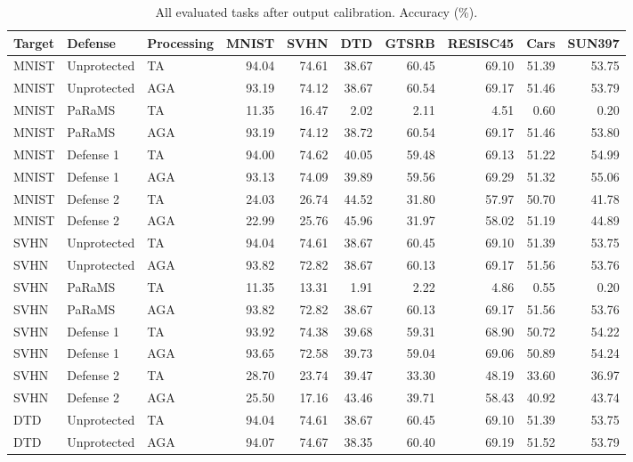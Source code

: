 \begin{table}[t]
\centering\small
\setlength{\tabcolsep}{4pt}
\caption{All evaluated tasks after output calibration. Accuracy (\%).}
\label{tab:eight_calibration}
\begin{tabular}{@{}lllrrrrrrr@{}}
\toprule
Target & Defense & Processing & MNIST & SVHN & DTD & GTSRB & RESISC45 & Cars & SUN397 \\
\midrule
MNIST & Unprotected & TA & 94.04 & 74.61 & 38.67 & 60.45 & 69.10 & 51.39 & 53.75 \\
MNIST & Unprotected & AGA & 93.19 & 74.12 & 38.67 & 60.54 & 69.17 & 51.46 & 53.79 \\
MNIST & PaRaMS & TA & 11.35 & 16.47 & 2.02 & 2.11 & 4.51 & 0.60 & 0.20 \\
MNIST & PaRaMS & AGA & 93.19 & 74.12 & 38.72 & 60.54 & 69.17 & 51.46 & 53.80 \\
MNIST & Defense 1 & TA & 94.00 & 74.62 & 40.05 & 59.48 & 69.13 & 51.22 & 54.99 \\
MNIST & Defense 1 & AGA & 93.13 & 74.09 & 39.89 & 59.56 & 69.29 & 51.32 & 55.06 \\
MNIST & Defense 2 & TA & 24.03 & 26.74 & 44.52 & 31.80 & 57.97 & 50.70 & 41.78 \\
MNIST & Defense 2 & AGA & 22.99 & 25.76 & 45.96 & 31.97 & 58.02 & 51.19 & 44.89 \\
\midrule
SVHN & Unprotected & TA & 94.04 & 74.61 & 38.67 & 60.45 & 69.10 & 51.39 & 53.75 \\
SVHN & Unprotected & AGA & 93.82 & 72.82 & 38.67 & 60.13 & 69.17 & 51.56 & 53.76 \\
SVHN & PaRaMS & TA & 11.35 & 13.31 & 1.91 & 2.22 & 4.86 & 0.55 & 0.20 \\
SVHN & PaRaMS & AGA & 93.82 & 72.82 & 38.67 & 60.13 & 69.17 & 51.56 & 53.76 \\
SVHN & Defense 1 & TA & 93.92 & 74.38 & 39.68 & 59.31 & 68.90 & 50.72 & 54.22 \\
SVHN & Defense 1 & AGA & 93.65 & 72.58 & 39.73 & 59.04 & 69.06 & 50.89 & 54.24 \\
SVHN & Defense 2 & TA & 28.70 & 23.74 & 39.47 & 33.30 & 48.19 & 33.60 & 36.97 \\
SVHN & Defense 2 & AGA & 25.50 & 17.16 & 43.46 & 39.71 & 58.43 & 40.92 & 43.74 \\
\midrule
DTD & Unprotected & TA & 94.04 & 74.61 & 38.67 & 60.45 & 69.10 & 51.39 & 53.75 \\
DTD & Unprotected & AGA & 94.07 & 74.67 & 38.35 & 60.40 & 69.19 & 51.52 & 53.79 \\

\end{tabular}
\end{table}
